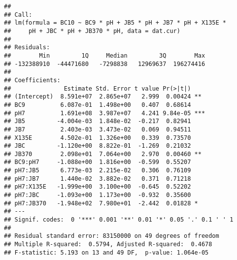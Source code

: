 \documentclass[
]{article}
\begin{document}
\begin{verbatim}
## 
## Call:
## lm(formula = BC10 ~ BC9 * pH + JB5 * pH + JB7 * pH + X135E * 
##     pH + JBC * pH + JB370 * pH, data = dat.cur)
## 
## Residuals:
##        Min         1Q     Median         3Q        Max 
## -132388910  -44471680   -7298838   12969637  196274416 
## 
## Coefficients:
##               Estimate Std. Error t value Pr(>|t|)    
## (Intercept)  8.591e+07  2.865e+07   2.999  0.00424 ** 
## BC9          6.087e-01  1.498e+00   0.407  0.68614    
## pH7          1.691e+08  3.987e+07   4.241 9.84e-05 ***
## JB5         -4.004e-03  1.848e-02  -0.217  0.82941    
## JB7          2.403e-03  3.473e-02   0.069  0.94511    
## X135E        4.502e-01  1.326e+00   0.339  0.73570    
## JBC         -1.120e+00  8.822e-01  -1.269  0.21032    
## JB370        2.098e+01  7.064e+00   2.970  0.00460 ** 
## BC9:pH7     -1.088e+00  1.816e+00  -0.599  0.55207    
## pH7:JB5      6.773e-03  2.215e-02   0.306  0.76109    
## pH7:JB7      1.440e-02  3.882e-02   0.371  0.71218    
## pH7:X135E   -1.999e+00  3.100e+00  -0.645  0.52202    
## pH7:JBC     -1.093e+00  1.173e+00  -0.932  0.35600    
## pH7:JB370   -1.948e+02  7.980e+01  -2.442  0.01828 *  
## ---
## Signif. codes:  0 '***' 0.001 '**' 0.01 '*' 0.05 '.' 0.1 ' ' 1
## 
## Residual standard error: 83150000 on 49 degrees of freedom
## Multiple R-squared:  0.5794, Adjusted R-squared:  0.4678 
## F-statistic: 5.193 on 13 and 49 DF,  p-value: 1.064e-05
\end{verbatim}
\end{document}
